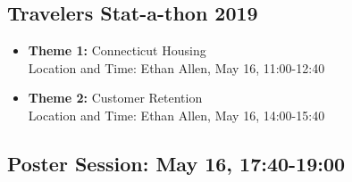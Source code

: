 \documentclass[10pt]{article}
\begin{document}
\subsection*{Travelers Stat-a-thon 2019}
\begin{itemize}
\item \textbf{Theme 1:} Connecticut Housing \\
  Location and Time: Ethan Allen, May 16, 11:00-12:40
  
\item \textbf{Theme 2:} Customer Retention \\
  Location and Time: Ethan Allen, May 16, 14:00-15:40
  
\end{itemize}

\subsection*{Poster Session: May 16, 17:40-19:00}
\vspace{8pt}


\clearpage



\clearpage




% 


% 
\end{document}
